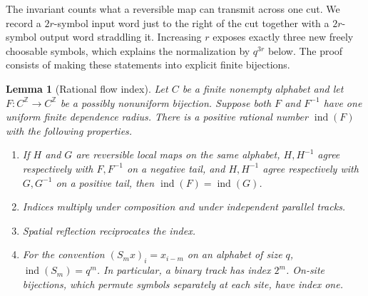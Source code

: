 \documentclass[11pt]{article}
\newtheorem{lemma}[theorem]{Lemma}
\theoremstyle{definition}
\theoremstyle{remark}
\begin{document}
The invariant counts what a reversible map can transmit across one cut.  We
record a $2r$-symbol input word just to the right of the cut together with a
$2r$-symbol output word straddling it.  Increasing $r$ exposes exactly three
new freely choosable symbols, which explains the normalization by $q^{3r}$
below.  The proof consists of making these statements into explicit finite
bijections.

\begin{lemma}[Rational flow index]
\label{lem:flow-index}
Let $C$ be a finite nonempty alphabet and let
$F:C^{\mathbb Z}\to C^{\mathbb Z}$ be a possibly nonuniform bijection.
Suppose both $F$ and $F^{-1}$ have one uniform finite dependence radius.
There is a positive rational number
$\operatorname{ind}(F)$ with the following properties.
\begin{enumerate}[label=\textup{(\roman*)}]
\item If $H$ and $G$ are reversible local maps on the same alphabet,
      $H,H^{-1}$ agree respectively with $F,F^{-1}$ on a negative tail,
      and $H,H^{-1}$ agree respectively with $G,G^{-1}$ on a positive tail, then
      $\operatorname{ind}(F)=\operatorname{ind}(G)$.
\item Indices multiply under composition and under independent parallel
      tracks.
\item Spatial reflection reciprocates the index.
\item For the convention $(S_mx)_i=x_{i-m}$ on an alphabet of size $q$,
      $\operatorname{ind}(S_m)=q^m$.  In particular, a binary track has index
      $2^m$.  On-site bijections, which permute symbols separately at
      each site, have index one.
\end{enumerate}
\end{lemma}
\end{document}
